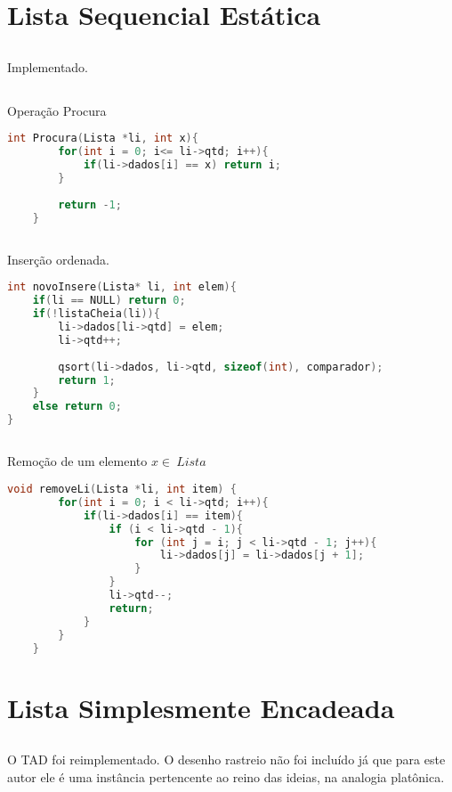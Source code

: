 \section{Lista Sequencial Estática}
\subsection{}
Implementado. 

\subsection{}
Operação Procura
\begin{lstlisting}[language=C]
	int Procura(Lista *li, int x){
		for(int i = 0; i<= li->qtd; i++){
			if(li->dados[i] == x) return i;
		}
		
		return -1;
	}
\end{lstlisting}

\subsection{} Inserção ordenada. 
\begin{lstlisting}[language=C]
int novoInsere(Lista* li, int elem){
	if(li == NULL) return 0;
	if(!listaCheia(li)){
		li->dados[li->qtd] = elem;
		li->qtd++;
		
		qsort(li->dados, li->qtd, sizeof(int), comparador);
		return 1;
	}
	else return 0;
}
\end{lstlisting}

\newpage
\subsection{} Remoção de um elemento $x \in \ Lista$

\begin{lstlisting}[language=C]
	void removeLi(Lista *li, int item) {
		for(int i = 0; i < li->qtd; i++){
			if(li->dados[i] == item){
				if (i < li->qtd - 1){
					for (int j = i; j < li->qtd - 1; j++){
						li->dados[j] = li->dados[j + 1];
					}
				}
				li->qtd--;
				return;
			}
		}
	}
\end{lstlisting}

\section{Lista Simplesmente Encadeada}

\subsection{} 
O TAD foi reimplementado. O desenho rastreio não foi incluído já que para este autor ele é uma instância pertencente ao reino das ideias, na analogia platônica.  
\label{sec:21} 

